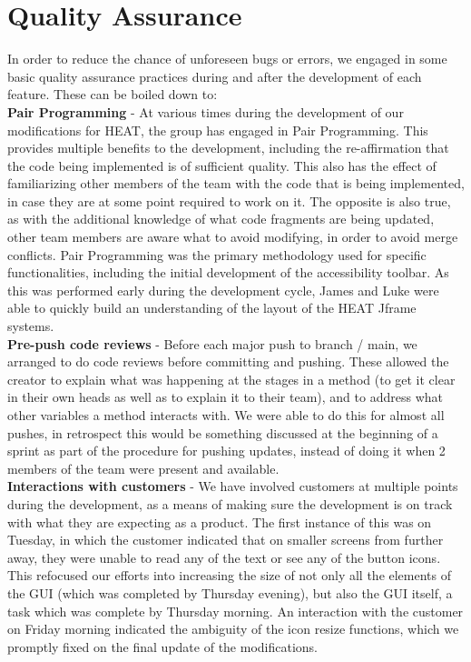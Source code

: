 \section{\textbf{Quality Assurance}}

In order to reduce the chance of unforeseen bugs or errors, we engaged in some basic quality assurance practices during and after the development of each feature. These can be boiled down to: \\

\textbf{Pair Programming} - At various times during the development of our modifications for HEAT, the group has engaged in Pair Programming. This provides multiple benefits to the development, including the re-affirmation that the code being implemented is of sufficient quality. This also has the effect of familiarizing other members of the team with the code that is being implemented, in case they are at some point required to work on it. The opposite is also true, as with the additional knowledge of what code fragments are being updated, other team members are aware what to avoid modifying, in order to avoid merge conflicts. Pair Programming was the primary methodology used for specific functionalities, including the initial development of the accessibility toolbar. As this was performed early during the development cycle, James and Luke were able to quickly build an understanding of the layout of the HEAT Jframe systems.  \\

 

\textbf{Pre-push code reviews} - Before each major push to branch / main, we arranged to do code reviews before committing and pushing. These allowed the creator to explain what was happening at the stages in a method (to get it clear in their own heads as well as to explain it to their team), and to address what other variables a method interacts with. We were able to do this for almost all pushes, in retrospect this would be something discussed at the beginning of a sprint as part of the procedure for pushing updates, instead of doing it when 2 members of the team were present and available.  \\

 

\textbf{Interactions with customers } - We have involved customers at multiple points during the development, as a means of making sure the development is on track with what they are expecting as a product.  The first instance of this was on Tuesday, in which the customer indicated that on smaller screens from further away, they were unable to read any of the text or see any of the button icons. This refocused our efforts into increasing the size of not only all the elements of the GUI (which was completed by Thursday evening), but also the GUI itself, a task which was complete by Thursday morning. An interaction with the customer on Friday morning indicated the ambiguity of the icon resize functions, which we promptly fixed on the final update of the modifications. \\

